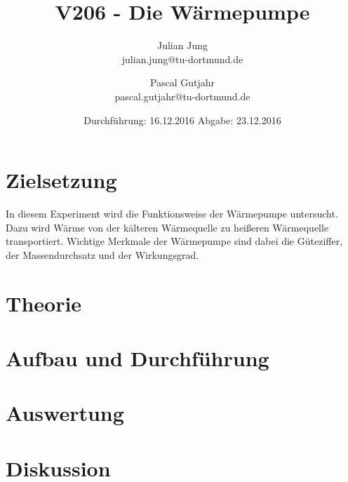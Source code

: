 

\title{V206 - Die Wärmepumpe}
\author{Julian Jung \\ julian.jung@tu-dortmund.de
  \and Pascal Gutjahr \\ pascal.gutjahr@tu-dortmund.de}
  \date{Durchführung: 16.12.2016
  \hspace{3em}
  Abgabe: 23.12.2016}
  
\maketitle
\newpage
\tableofcontents
\newpage
\section{Zielsetzung}
In diesem Experiment wird die Funktionsweise der Wärmepumpe untersucht. Dazu wird
Wärme von der kälteren Wärmequelle zu heißeren Wärmequelle transportiert. Wichtige
Merkmale der Wärmepumpe sind dabei die Güteziffer, der Massendurchsatz und der
Wirkungsgrad.
\section{Theorie}
 
\section{Aufbau und Durchführung}
 
 \newpage
\section{Auswertung}
 
\section{Diskussion}
 
\printbibliography

